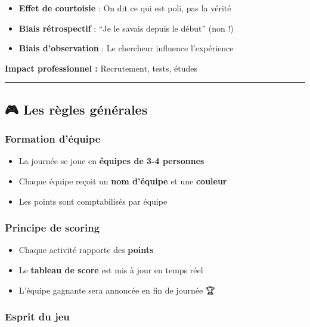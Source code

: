 \documentclass[
]{article}
\providecommand{\tightlist}{%
  \setlength{\itemsep}{0pt}\setlength{\parskip}{0pt}}
\begin{document}
\begin{itemize}
\tightlist
\item
  \textbf{Effet de courtoisie} : On dit ce qui est poli, pas la vérité
\item
  \textbf{Biais rétrospectif} : ``Je le savais depuis le début'' (non !)
\item
  \textbf{Biais d'observation} : Le chercheur influence l'expérience
\end{itemize}

\textbf{Impact professionnel :} Recrutement, tests, études

\begin{center}\rule{0.5\linewidth}{0.5pt}\end{center}

\subsection{🎮 Les règles
générales}\label{les-ruxe8gles-guxe9nuxe9rales}

\subsubsection{Formation d'équipe}\label{formation-duxe9quipe}

\begin{itemize}
\tightlist
\item
  La journée se joue en \textbf{équipes de 3-4 personnes}
\item
  Chaque équipe reçoit un \textbf{nom d'équipe} et une \textbf{couleur}
\item
  Les points sont comptabilisés par équipe
\end{itemize}

\subsubsection{Principe de scoring}\label{principe-de-scoring}

\begin{itemize}
\tightlist
\item
  Chaque activité rapporte des \textbf{points}
\item
  Le \textbf{tableau de score} est mis à jour en temps réel
\item
  L'équipe gagnante sera annoncée en fin de journée 🏆
\end{itemize}

\subsubsection{Esprit du jeu}\label{esprit-du-jeu}
\end{document}

